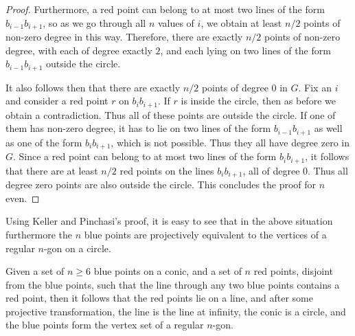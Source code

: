 \documentclass[a4paper,11pt,leqno]{article}
\begin{document}
\begin{proof}
Furthermore, a red point can belong to at most two lines of the form $b_{i-1}b_{i+1}$, so as we go through all $n$ values of $i$, we obtain at least $n/2$ points of non-zero degree in this way.
Therefore, there are exactly $n/2$ points of non-zero degree, with each of degree exactly $2$, and each lying on two lines of the form $b_{i-1}b_{i+1}$ outside the circle.

It also follows then that there are exactly $n/2$ points of degree $0$ in $G$.
Fix an $i$ and consider a red point $r$ on $b_ib_{i+1}$.
If $r$ is inside the circle, then as before we obtain a contradiction.
Thus all of these points are outside the circle.
If one of them has non-zero degree, it has to lie on two lines of the form $b_{i-1}b_{i+1}$ as well as one of the form $b_ib_{i+1}$, which is not possible.
Thus they all have degree zero in $G$.
Since a red point can belong to at most two lines of the form $b_ib_{i+1}$, it follows that there are at least $n/2$ red points on the lines $b_ib_{i+1}$, all of degree $0$.
Thus all degree zero points are also outside the circle.
This concludes the proof for $n$ even.
\end{proof}
Using Keller and Pinchasi's proof, it is easy to see that in the above situation furthermore the $n$ blue points are projectively equivalent to the vertices of a regular $n$-gon on a circle.
\begin{corollary}\label{conj:milicevic-special}
Given a set of $n\geq 6$ blue points on a conic, and a set of $n$ red points, disjoint from the blue points, such that the line through any two blue points contains a red point, then it follows that the red points lie on a line, and after some projective transformation, the line is the line at infinity, the conic is a circle, and the blue points form the vertex set of a regular $n$-gon.
\end{corollary}
\end{document}
